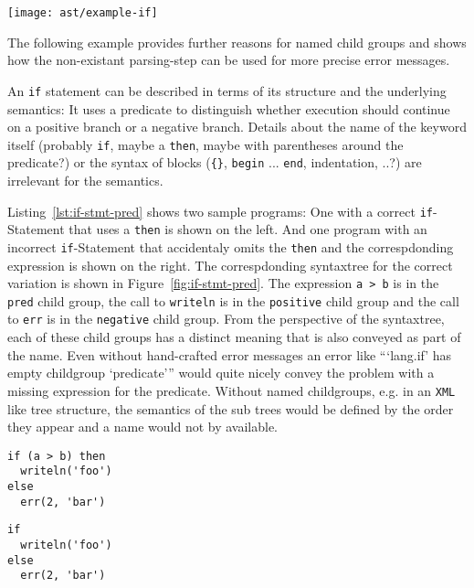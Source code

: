 \documentclass[sigconf,natbib=false]{acmart}
\newcommand\astScale{0.7}
\begin{document}
\begin{figure*}
  \texttt{[image: ast/example-if]}
  \caption{\texttt{if}-Statement with predicate}
  \label{fig:if-stmt-pred}
\end{figure*}

The following example provides further reasons for named child groups and shows how the non-existant parsing-step can be used for more precise error messages.

An \texttt{if} statement can be described in terms of its structure and the underlying semantics: It uses a predicate to distinguish whether execution should continue on a positive branch or a negative branch. Details about the name of the keyword itself (probably \texttt{if}, maybe a \texttt{then}, maybe with parentheses around the predicate?) or the syntax of blocks (\texttt{\{\}}, \texttt{begin} ... \texttt{end}, indentation, ..?) are irrelevant for the semantics.


Listing~\ref{lst:if-stmt-pred} shows two sample programs: One with a correct \texttt{if}-Statement that uses a \texttt{then} is shown on the left. And one program with an incorrect \texttt{if}-Statement that accidentaly omits the \texttt{then} and the correspdonding expression is shown on the right. The correspdonding syntaxtree for the correct variation is shown in Figure~\ref{fig:if-stmt-pred}. The expression \texttt{a > b} is in the \texttt{pred} child group, the call to \texttt{writeln} is in the \texttt{positive} child group and the call to \texttt{err} is in the \texttt{negative} child group. From the perspective of the syntaxtree, each of these child groups has a distinct meaning that is also conveyed as part of the name. Even without hand-crafted error messages an error like \enquote{\enquote{lang.if} has empty childgroup \enquote{predicate}} would quite nicely convey the problem with a missing expression for the predicate. Without named childgroups, e.g. in an \texttt{XML} like tree structure, the semantics of the sub trees would be defined by the order they appear and a name would not by available.

\begin{listing}[H]
\begin{minipage}{.20\textwidth}
\begin{verbatim}
if (a > b) then
  writeln('foo')
else
  err(2, 'bar')
\end{verbatim}
\end{minipage}
\begin{minipage}{.20\textwidth}
\begin{verbatim}
if
  writeln('foo')
else
  err(2, 'bar')
\end{verbatim}
\end{minipage}
\caption{\texttt{if}-Statement with and without predicate}
\label{lst:if-stmt-pred}
\end{listing}
\end{document}
